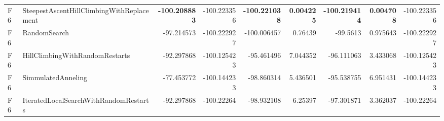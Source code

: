 \begin{tabular}{llrrrrrrr}
F6 & SteepestAscentHillClimbingWithReplacement & \textbf{-100.208883} & -100.223356 & \textbf{-100.221038} & \textbf{0.004225} & \textbf{-100.219414} & \textbf{0.004708} & -100.223356 \\ 
F6 & RandomSearch & -97.214573 & -100.222927 & -100.006457 & 0.76439 & -99.5613 & 0.975643 & -100.222927 \\ 
F6 & HillClimbingWithRandomRestarts & -92.297868 & -100.125423 & -95.461496 & 7.044352 & -96.111063 & 3.433068 & -100.125423 \\ 
F6 & SimmulatedAnneling & -77.453772 & -100.144233 & -98.860314 & 5.436501 & -95.538755 & 6.951431 & -100.144233 \\ 
F6 & IteratedLocalSearchWithRandomRestarts & -92.297868 & -100.22264 & -98.932108 & 6.25397 & -97.301871 & 3.362037 & -100.22264 \\ 
\bottomrule
\end{tabular}
